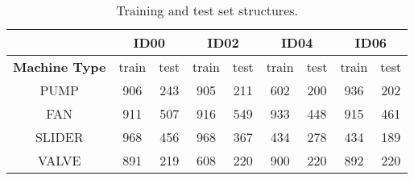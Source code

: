 \begin{table}[ht]
\centering
\begin{tabular}{|c|c|c|c|c|c|c|c|c|} 
\cline{2-9}
\multicolumn{1}{c|}{} & \multicolumn{2}{c|}{\textbf{ID00}} & \multicolumn{2}{c|}{\textbf{ID02}} & \multicolumn{2}{c|}{\textbf{ID04}} & \multicolumn{2}{c|}{\textbf{ID06}} \\ 
\hline
\textbf{Machine Type} & train & test & train & test & train & test & train & test \\ 
\hline
PUMP & 906 & 243 & 905 & 211 & 602 & 200 & 936 & 202 \\ 
\hline
FAN & 911 & 507 & 916 & 549 & 933 & 448 & 915 & 461 \\ 
\hline
SLIDER & 968 & 456 & 968 & 367 & 434 & 278 & 434 & 189 \\ 
\hline
VALVE & 891 & 219 & 608 & 220 & 900 & 220 & 892 & 220 \\
\hline
\end{tabular}
\caption{Training and test set structures.}
\label{training-test-sets-structure}
\end{table}
